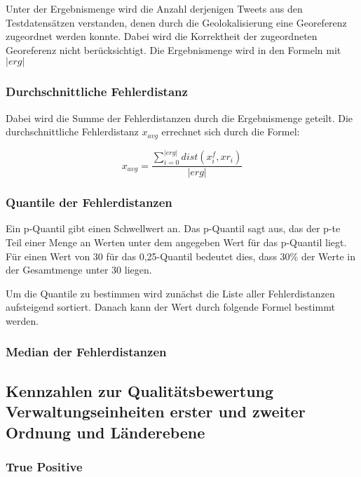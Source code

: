 				Unter der Ergebnismenge wird die Anzahl derjenigen Tweets aus den Testdatensätzen verstanden, denen durch die Geolokalisierung eine Georeferenz zugeordnet werden konnte.
				Dabei wird die Korrektheit der zugeordneten Georeferenz nicht berücksichtigt.
				Die Ergebnismenge wird in den Formeln mit $|erg|$

			\subsubsection{Durchschnittliche Fehlerdistanz} 

				Dabei wird die Summe der Fehlerdistanzen durch die Ergebnismenge geteilt.
				Die durchschnittliche Fehlerdistanz $x_{avg}$ errechnet sich durch die Formel:

				\begin{equation}
					x_{avg}=\frac{\sum_{i=0}^{|erg|}{dist(x^f_i,xr_i)}}{|erg|}
				\end{equation}	


			\subsubsection{Quantile der Fehlerdistanzen}

				Ein p-Quantil gibt einen Schwellwert an.
				Das p-Quantil sagt aus, das der p-te Teil einer Menge an Werten unter dem angegeben Wert für das p-Quantil liegt.
				Für einen Wert von 30 für das 0,25-Quantil bedeutet dies, dass 30\% der Werte in der Gesamtmenge unter 30 liegen.

				Um die Quantile zu bestimmen wird zunächst die Liste aller Fehlerdistanzen aufsteigend sortiert.
				Danach kann der Wert durch folgende Formel bestimmt werden. 


			\subsubsection{Median der Fehlerdistanzen}


		\subsection{Kennzahlen zur Qualitätsbewertung Verwaltungseinheiten erster und zweiter Ordnung und Länderebene} 

			\subsubsection{True Positive}

